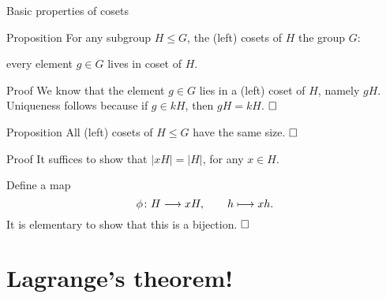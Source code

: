 \documentclass[8pt, handout]{beamer}
\newcommand{\Pause}{\pause}      %
\begin{document}
\begin{frame}{Basic properties of cosets}

  \begin{block}{Proposition}
    For any subgroup $H\leq G$, the (left) cosets of $H$ 
    the group $G$: \Pause

    every element $g\in G$ lives in  coset of $H$.
  \end{block}

  \pause
  
  \begin{exampleblock}{Proof} \Pause
    We know that the element $g\in G$ lies in a (left) coset of $H$, namely
    $gH$. \Pause Uniqueness follows because if $g\in kH$, then
    $gH=kH$. $\hfill\Box$
  \end{exampleblock}

  \pause

  \begin{block}{Proposition}
    All (left) cosets of $H\leq G$ have the same size. $\hfill\Box$
  \end{block}

  \pause
  
  \begin{exampleblock}{Proof} \Pause
    It suffices to show that $|xH|=|H|$, for any $x\in H$. \medskip\Pause

    Define a map
    \[
    \phi\colon H\longrightarrow xH,\qquad h\longmapsto xh.
    \]
    It is elementary to show that this is a bijection. $\hfill\Box$
  \end{exampleblock}
  
\end{frame}

\section{Lagrange's theorem!}
\end{document}
